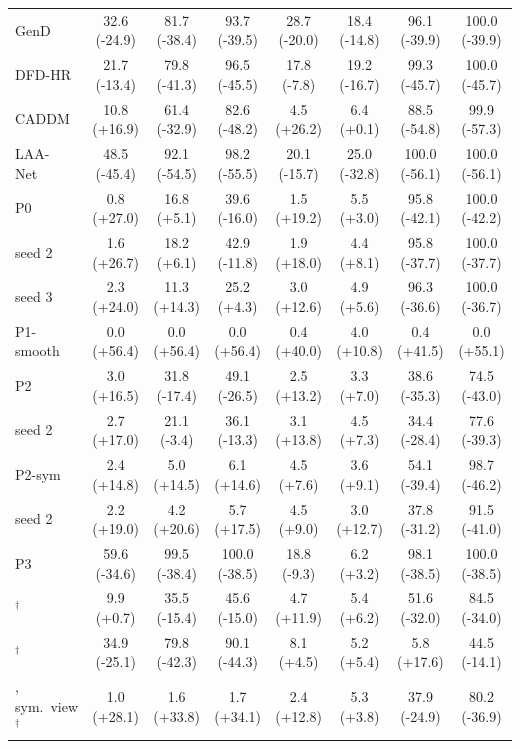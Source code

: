 \begin{tabular}{@{}l ccccccc@{}}
GenD~\cite{gend2026} & 32.6 (-24.9) & 81.7 (-38.4) & 93.7 (-39.5) & 28.7 (-20.0) & 18.4 (-14.8) & 96.1 (-39.9) & 100.0 (-39.9) \\
DFD-HR~\cite{dfdhr2026} & 21.7 (-13.4) & 79.8 (-41.3) & 96.5 (-45.5) & 17.8 (-7.8) & 19.2 (-16.7) & 99.3 (-45.7) & 100.0 (-45.7) \\
CADDM~\cite{caddm} & 10.8 (+16.9) & 61.4 (-32.9) & 82.6 (-48.2) & 4.5 (+26.2) & 6.4 (+0.1) & 88.5 (-54.8) & 99.9 (-57.3) \\
LAA-Net~\cite{laanet} & 48.5 (-45.4) & 92.1 (-54.5) & 98.2 (-55.5) & 20.1 (-15.7) & 25.0 (-32.8) & 100.0 (-56.1) & 100.0 (-56.1) \\
\midrule
P0 & 0.8 (+27.0) & 16.8 (+5.1) & 39.6 (-16.0) & 1.5 (+19.2) & 5.5 (+3.0) & 95.8 (-42.1) & 100.0 (-42.2) \\
\quad seed 2 & 1.6 (+26.7) & 18.2 (+6.1) & 42.9 (-11.8) & 1.9 (+18.0) & 4.4 (+8.1) & 95.8 (-37.7) & 100.0 (-37.7) \\
\quad seed 3 & 2.3 (+24.0) & 11.3 (+14.3) & 25.2 (+4.3) & 3.0 (+12.6) & 4.9 (+5.6) & 96.3 (-36.6) & 100.0 (-36.7) \\
P1-smooth & 0.0 (+56.4) & 0.0 (+56.4) & 0.0 (+56.4) & 0.4 (+40.0) & 4.0 (+10.8) & 0.4 (+41.5) & 0.0 (+55.1) \\
P2 & 3.0 (+16.5) & 31.8 (-17.4) & 49.1 (-26.5) & 2.5 (+13.2) & 3.3 (+7.0) & 38.6 (-35.3) & 74.5 (-43.0) \\
\quad seed 2 & 2.7 (+17.0) & 21.1 (-3.4) & 36.1 (-13.3) & 3.1 (+13.8) & 4.5 (+7.3) & 34.4 (-28.4) & 77.6 (-39.3) \\
P2-sym & 2.4 (+14.8) & 5.0 (+14.5) & 6.1 (+14.6) & 4.5 (+7.6) & 3.6 (+9.1) & 54.1 (-39.4) & 98.7 (-46.2) \\
\quad seed 2 & 2.2 (+19.0) & 4.2 (+20.6) & 5.7 (+17.5) & 4.5 (+9.0) & 3.0 (+12.7) & 37.8 (-31.2) & 91.5 (-41.0) \\
P3 & 59.6 (-34.6) & 99.5 (-38.4) & 100.0 (-38.5) & 18.8 (-9.3) & 6.2 (+3.2) & 98.1 (-38.5) & 100.0 (-38.5) \\
\oursB{}$^\dagger$ & 9.9 (+0.7) & 35.5 (-15.4) & 45.6 (-15.0) & 4.7 (+11.9) & 5.4 (+6.2) & 51.6 (-32.0) & 84.5 (-34.0) \\
\oursF{}$^\dagger$ & 34.9 (-25.1) & 79.8 (-42.3) & 90.1 (-44.3) & 8.1 (+4.5) & 5.2 (+5.4) & 5.8 (+17.6) & 44.5 (-14.1) \\
\oursF{}, sym.\ view$^\dagger$ & 1.0 (+28.1) & 1.6 (+33.8) & 1.7 (+34.1) & 2.4 (+12.8) & 5.3 (+3.8) & 37.9 (-24.9) & 80.2 (-36.9) \\
\bottomrule
\end{tabular}
